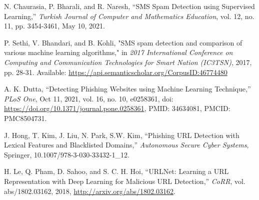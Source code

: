 \documentclass[conference]{IEEEtran}
\begin{document}
\begin{thebibliography}{00}



    N. Chaurasia, P. Bharali, and R. Naresh, 
    ``SMS Spam Detection using Supervised Learning,'' 
    \emph{Turkish Journal of Computer and Mathematics Education}, vol. 12, no. 11, pp. 3454-3461, May 10, 2021.

    P. Sethi, V. Bhandari, and B. Kohli, "SMS spam detection and comparison of various machine learning algorithms," in \emph{2017 International Conference on Computing and Communication Technologies for Smart Nation (IC3TSN)}, 2017, pp. 28-31. Available: \url{https://api.semanticscholar.org/CorpusID:46774480}

    A. K. Dutta, 
    ``Detecting Phishing Websites using Machine Learning Technique,'' 
    \emph{PLoS One}, Oct 11, 2021, vol. 16, no. 10, e0258361, doi: \url{https://doi.org/10.1371/journal.pone.0258361}, PMID: 34634081, PMCID: PMC8504731.

    J. Hong, T. Kim, J. Liu, N. Park, S.W. Kim, 
    ``Phishing URL Detection with Lexical Features and Blacklisted Domains,'' 
    \emph{Autonomous Secure Cyber Systems}, Springer, 10.1007/978-3-030-33432-1\_12.

    H. Le, Q. Pham, D. Sahoo, and S. C. H. Hoi,
    ``URLNet: Learning a URL Representation with Deep Learning for Malicious URL Detection,''
    \emph{CoRR},
    vol. abs/1802.03162,
    2018,
    \url{http://arxiv.org/abs/1802.03162}.

    

\end{thebibliography}
\end{document}
